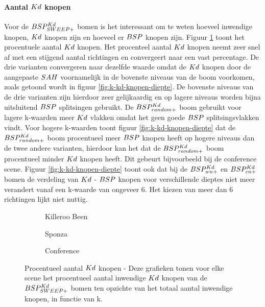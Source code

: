 \paragraph{Aantal $\symKd$ knopen}
Voor de $BSP^{Kd}_{SWEEP+}$ bomen is het interessant om te weten hoeveel inwendige knopen, $\symKd$ knopen zijn en hoeveel er $BSP$ knopen zijn.
Figuur \ref{fig:k-kd-knopen} toont het procentuele aantal $\symKd$ knopen.
Het procenteel aantal $\symKd$ knopen neemt zeer snel af met een stijgend aantal richtingen en convergeert naar een vast percentage.
De drie varianten convergeren naar dezelfde waarde omdat de $\symKd$ knopen door de aangepaste $SAH$ voornamelijk in de bovenste niveaus van de boom voorkomen, zoals getoond wordt in figuur \ref{fig:k-kd-knopen-diepte}.
De bovenste niveaus van de drie varianten zijn hierdoor zeer gelijkaardig en op lagere niveaus worden bijna uitsluitend $BSP$ splitsingen gebruikt.
De $BSP^{Kd}_{random+}$ boom gebruikt voor lagere k-waarden meer $\symKd$ vlakken omdat het geen goede $BSP$ splitsingsvlakken vindt.
Voor hogere k-waarden toont figuur \ref{fig:k-kd-knopen-diepte} dat de $BSP^{Kd}_{random+}$ boom procentueel meer $BSP$ knopen heeft op hogere niveaus dan de twee andere varianten, hierdoor kan het dat de $BSP^{Kd}_{random+}$ boom procentueel minder $\symKd$ knopen heeft.
Dit gebeurt bijvoorbeeld bij de conference scene.
Figuur \ref{fig:k-kd-knopen-diepte} toont ook dat bij de $BSP^{Kd}_{wn+}$ en $BSP^{Kd}_{cn+}$ bomen de verdeling van $\symKd$ - $BSP$ knopen voor verschillende dieptes niet meer verandert vanaf een k-waarde van ongeveer 6.
Het kiezen van meer dan 6 richtingen lijkt niet nuttig.

\begin{figure}[h]
  \centering
  \begin{subfigure}[t]{.32\linewidth}
    \centering
{}
\caption{Killeroo Been}
  \end{subfigure}
  \begin{subfigure}[t]{.32\linewidth}
    \centering
{}
\caption{Sponza}
\end{subfigure}
\begin{subfigure}[t]{.32\linewidth}
  \centering
{}
\caption{Conference}
\end{subfigure}
\caption[Procentueel aantal $\symKd$ knopen]{Procentueel aantal $\symKd$ knopen - \small Deze grafieken tonen voor elke scene het procentueel aantal inwendige $\symKd$ knopen van de $BSP^{Kd}_{SWEEP+}$ bomen ten opzichte van het totaal aantal inwendige knopen, in functie van k.}
\label{fig:k-kd-knopen}
\end{figure}

